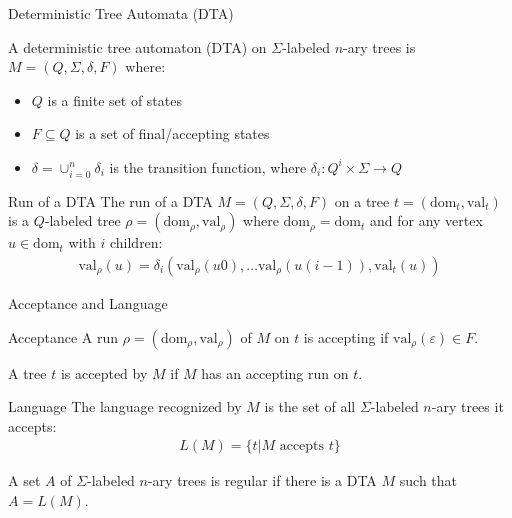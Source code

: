 \documentclass[10pt,svgnames,fragile]{beamer}
\begin{document}
\begin{frame}{Deterministic Tree Automata (DTA)}
  \begin{definition}
    A deterministic tree automaton (DTA) on $\Sigma$-labeled $n$-ary trees is $M = (Q, \Sigma, \delta, F)$ where:
    \begin{itemize}
      \item $Q$ is a finite set of states
      \item $F \subseteq Q$ is a set of final/accepting states
      \item $\delta = \cup_{i=0}^{n} \delta_i$ is the transition function, where $\delta_i: Q^i \times \Sigma \to Q$
    \end{itemize}
  \end{definition}
  
  \pause
  
  \begin{block}{Run of a DTA}
    The run of a DTA $M = (Q, \Sigma, \delta, F)$ on a tree $t = (\text{dom}_t, \text{val}_t)$ is a $Q$-labeled tree $\rho = (\text{dom}_\rho, \text{val}_\rho)$ where $\text{dom}_\rho = \text{dom}_t$ and for any vertex $u \in \text{dom}_t$ with $i$ children:
    \begin{align*}
      \text{val}_\rho(u) = \delta_i(\text{val}_\rho(u0), \ldots \text{val}_\rho(u(i-1)), \text{val}_t(u))
    \end{align*}
  \end{block}
\end{frame}

\begin{frame}{Acceptance and Language}
  \begin{block}{Acceptance}
    A run $\rho = (\text{dom}_\rho, \text{val}_\rho)$ of $M$ on $t$ is accepting if $\text{val}_\rho(\varepsilon) \in F$.
    
    A tree $t$ is accepted by $M$ if $M$ has an accepting run on $t$.
  \end{block}
  
  \pause
  
  \begin{block}{Language}
    The language recognized by $M$ is the set of all $\Sigma$-labeled $n$-ary trees it accepts:
    \begin{align*}
      L(M) = \{t | M \text{ accepts } t\}
    \end{align*}
  \end{block}
  
  \pause
  
  \begin{definition}
    A set $A$ of $\Sigma$-labeled $n$-ary trees is regular if there is a DTA $M$ such that $A = L(M)$.
  \end{definition}
\end{frame}
\end{document}

